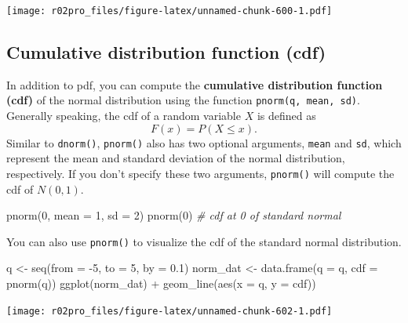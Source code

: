 \documentclass[
]{book}
\newenvironment{Shaded}{\begin{snugshade}}{\end{snugshade}}
\newcommand{\AttributeTok}[1]{\textcolor[rgb]{0.77,0.63,0.00}{#1}}
\newcommand{\CommentTok}[1]{\textcolor[rgb]{0.56,0.35,0.01}{\textit{#1}}}
\newcommand{\DecValTok}[1]{\textcolor[rgb]{0.00,0.00,0.81}{#1}}
\newcommand{\FloatTok}[1]{\textcolor[rgb]{0.00,0.00,0.81}{#1}}
\newcommand{\FunctionTok}[1]{\textcolor[rgb]{0.00,0.00,0.00}{#1}}
\newcommand{\NormalTok}[1]{#1}
\newcommand{\OtherTok}[1]{\textcolor[rgb]{0.56,0.35,0.01}{#1}}
\newcommand{\SpecialCharTok}[1]{\textcolor[rgb]{0.00,0.00,0.00}{#1}}
\begin{document}
\texttt{[image: r02pro\_files/figure-latex/unnamed-chunk-600-1.pdf]}

\hypertarget{cdf}{%
\subsection{Cumulative distribution function (cdf)}\label{cdf}}

In addition to pdf, you can compute the \textbf{cumulative distribution function (cdf)} of the normal distribution using the function \texttt{pnorm(q,\ mean,\ sd)}. Generally speaking, the cdf of a random variable \(X\) is defined as
\[F(x) = P(X\leq x).\] Similar to \texttt{dnorm()}, \texttt{pnorm()} also has two optional arguments, \texttt{mean} and \texttt{sd}, which represent the mean and standard deviation of the normal distribution, respectively. If you don't specify these two arguments, \texttt{pnorm()} will compute the cdf of \(N(0,1)\).

\begin{Shaded}
\begin{Highlighting}[]
\FunctionTok{pnorm}\NormalTok{(}\DecValTok{0}\NormalTok{, }\AttributeTok{mean =} \DecValTok{1}\NormalTok{, }\AttributeTok{sd =} \DecValTok{2}\NormalTok{)}
\FunctionTok{pnorm}\NormalTok{(}\DecValTok{0}\NormalTok{) }\CommentTok{\# cdf at 0 of standard normal}
\end{Highlighting}
\end{Shaded}

You can also use \texttt{pnorm()} to visualize the cdf of the standard normal distribution.

\begin{Shaded}
\begin{Highlighting}[]
\NormalTok{q }\OtherTok{\textless{}{-}} \FunctionTok{seq}\NormalTok{(}\AttributeTok{from =} \SpecialCharTok{{-}}\DecValTok{5}\NormalTok{, }\AttributeTok{to =} \DecValTok{5}\NormalTok{, }\AttributeTok{by =} \FloatTok{0.1}\NormalTok{)}
\NormalTok{norm\_dat }\OtherTok{\textless{}{-}} \FunctionTok{data.frame}\NormalTok{(}\AttributeTok{q =}\NormalTok{ q, }\AttributeTok{cdf =} \FunctionTok{pnorm}\NormalTok{(q))}
\FunctionTok{ggplot}\NormalTok{(norm\_dat) }\SpecialCharTok{+} \FunctionTok{geom\_line}\NormalTok{(}\FunctionTok{aes}\NormalTok{(}\AttributeTok{x =}\NormalTok{ q, }\AttributeTok{y =}\NormalTok{ cdf))}
\end{Highlighting}
\end{Shaded}

\texttt{[image: r02pro\_files/figure-latex/unnamed-chunk-602-1.pdf]}
\end{document}
